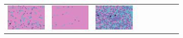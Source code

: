 \documentclass{ipol}
\begin{document}
\begin{figure}[ht]
\begin{subfigure}[t]{\linewidth}
\begin{tabular}{ccccccccc}
                \includegraphics[width=\s]{images/tower/AHD/bid_n5_128_grids.png}&
                \includegraphics[width=\s]{images/tower/DCB/bid_n5_128_grids.png}&
                \includegraphics[width=\s]{images/tower/DHT/bid_n5_128_grids.png}&

\end{tabular}
\end{subfigure}
\end{figure}
\end{document}
